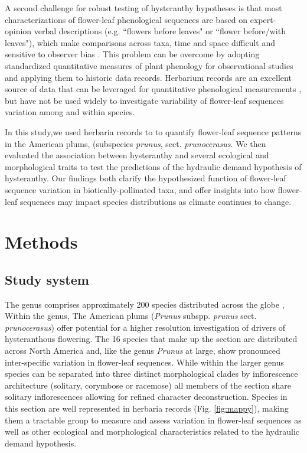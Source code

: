 \documentclass{article}[11pt]
\begin{document}
\noindent A second challenge for robust testing of hysteranthy hypotheses is that most characterizations of flower-leaf phenological sequences are based on expert-opinion verbal descriptions (e.g. ``flowers before leaves" or ``flower before/with leaves"), which make comparisons across taxa, time and space difficult and sensitive to observer bias  \citep[see;][]{Buonaiuto2020}. This problem can be overcome by adopting standardized quantitative measures of plant phenology for observational studies and applying them to historic data records. Herbarium records are an excellent source of data that can be leveraged for quantitative phenological measurements \citep{Willis2017}, but have not be used widely to investigate variability of flower-leaf sequences variation among and within species.

\noindent In this study,we used herbaria records to to quantify flower-leaf sequence patterns in the American plums, (subspecies  \textit{prunus}, sect. \textit{prunocerasus}. We then evaluated the association between hysteranthy and several ecological and morphological traits to test the predictions of the hydraulic demand hypothesis of hysteranthy. Our findings both clarify the hypothesized function of flower-leaf sequence variation in biotically-pollinated taxa, and offer insights into how flower-leaf sequences may impact species distributions as climate continues to change.






\section*{Methods}
\subsection{Study system}
\noindent The genus  comprises approximately 200 species distributed across the globe \citep{Chin:2014wu}, Within the genus, The American plums (\textit{Prunus} subspp. \textit{prunus} sect. \textit{prunocerasus}) offer potential for a higher resolution investigation of drivers of hysteranthous flowering. The 16 species that make up the section are distributed across North America and, like the genus \textit{Prunus} at large, show pronounced inter-specific variation in flower-leaf sequences. While within the larger genus species can be separated into three distinct morphological clades by inflorescence architecture (solitary, corymbose or racemose) all members of the section share solitary inflorescences \citep{Shaw:2004aa} allowing for refined character deconstruction. Species in this section are well represented in herbaria records (Fig. \ref{fig:mappy}), making them a tractable group to measure and assess variation in flower-leaf sequences as well as other ecological and morphological characteristics related to the hydraulic demand hypothesis. 
\end{document}
